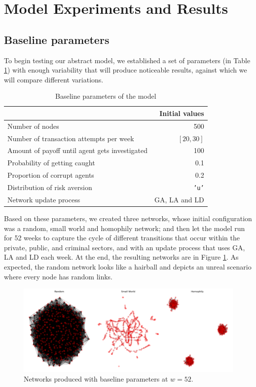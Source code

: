 \documentclass[letterpaper, 11pt]{article}
\begin{document}
\section{Model Experiments and Results}
\label{sec:orgb6a48ec}

\subsection{Baseline parameters}
\label{sec:org097db05}
To begin testing our abstract model, we established a set of parameters (in Table \ref{tab:org8a0c816}) with enough variability that will produce noticeable results, against which we will compare different variations.

\begin{table}[htbp]
\caption{\label{tab:org8a0c816}
Baseline parameters of the model}
\centering
\begin{tabular}{lr}
\hline
\hline
 & Initial values\\
\hline
Number of nodes & 500\\
Number of transaction attempts per week & \([20, 30]\)\\
Amount of payoff until agent gets investigated & 100\\
Probability of getting caught & 0.1\\
Proportion of corrupt agents & 0.2\\
Distribution of risk aversion & \texttt{'u'}\\
Network update process & GA, LA and LD\\
\hline
\hline
\end{tabular}
\end{table}

Based on these parameters, we created three networks, whose initial configuration was a random, small world and homophily network; and then let the model run for 52 weeks to capture the cycle of different transitions that occur within the private, public, and criminal sectors, and with an update process that uses GA, LA and LD \citep{murase2019} each week. At the end, the resulting networks are in Figure \ref{fig:org49f5a1f}. As expected, the random network looks like a hairball and depicts an unreal scenario where every node has random links. 

\begin{figure}[htbp]
\centering
\includegraphics[width=.9\linewidth]{img/f2.png}
\caption{\label{fig:org49f5a1f}
Networks produced with baseline parameters at \(w=52\).}
\end{figure}
\end{document}
